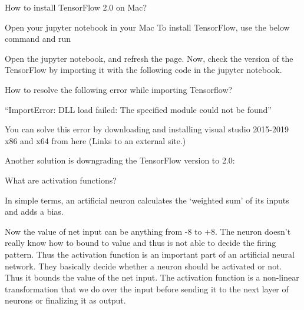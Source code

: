 	\begin{qanda}
		\begin{question}
How to install TensorFlow 2.0 on Mac?
		\end{question}
		\begin{answer}
Open your jupyter notebook in your Mac
To install TensorFlow, use the below command and run

Open the jupyter notebook, and refresh the page. Now, check the version of the TensorFlow by importing it with the following code in the jupyter notebook.
		\end{answer}
	\end{qanda}


	\begin{qanda}
		\begin{question}
How to resolve the following error while importing Tensorflow?
		\end{question}
		\begin{answer}
``ImportError: DLL load failed: The specified module could not be found''

You can solve this error by downloading and installing visual studio 2015-2019 x86 and x64 from here (Links to an external site.)

Another solution is downgrading the TensorFlow version to 2.0:


		\end{answer}
	\end{qanda}


	\begin{qanda}
		\begin{question}
What are activation functions?
		\end{question}
		\begin{answer}
In simple terms, an artificial neuron calculates the `weighted sum' of its inputs and adds a bias.

Now the value of net input can be anything from -8 to +8. The neuron doesn't really know how to bound to value and thus is not able to decide the firing pattern. Thus the activation function is an important part of an artificial neural network. They basically decide whether a neuron should be activated or not. Thus it bounds the value of the net input.  The activation function is a non-linear transformation that we do over the input before sending it to the next layer of neurons or finalizing it as output.
		\end{answer}
	\end{qanda}


